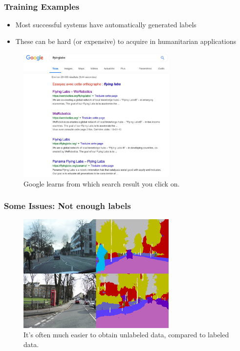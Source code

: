 \documentclass[10pt,mathserif]{beamer}
\begin{document}
\begin{frame}
  \frametitle{Training Examples}
  \begin{itemize}
  \item Most successful systems have automatically generated labels
  \item These can be hard (or expensive) to acquire in humanitarian applications
  \end{itemize} 
  \begin{figure}[ht]
    \centering
    \includegraphics[width=0.7\textwidth]{figures/flyinglabs.png}
    \caption{Google learns from which search result you click
      on. \label{fig:label} }
  \end{figure}
\end{frame}

\begin{frame}
  \frametitle{Some Issues: Not enough labels}
  \begin{figure}[ht]
    \centering
    \includegraphics[width=0.7\textwidth]{figures/segmentation_labels}
    \caption{It's often much easier to obtain unlabeled data, compared to
      labeled data. \label{fig:label} }
  \end{figure}

\end{frame}
\end{document}
